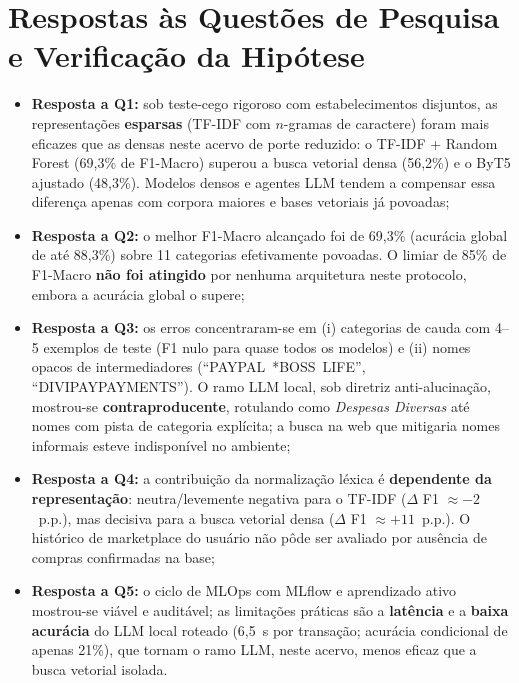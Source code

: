 \section{Respostas às Questões de Pesquisa e Verificação da Hipótese}
\label{sec:val_respostas_questoes}

\begin{itemize}
	\item \textbf{Resposta a Q1:} sob teste-cego rigoroso com estabelecimentos disjuntos,
	as representações \textbf{esparsas} (TF-IDF com $n$-gramas de caractere) foram mais
	eficazes que as densas neste acervo de porte reduzido: o TF-IDF + Random Forest
	(69,3\% de F1-Macro) superou a busca vetorial densa
	(56,2\%) e o ByT5 ajustado (48,3\%). Modelos
	densos e agentes LLM tendem a compensar essa diferença apenas com corpora maiores e bases
	vetoriais já povoadas;

	\item \textbf{Resposta a Q2:} o melhor F1-Macro alcançado foi de
	69,3\% (acurácia global de até 88,3\%) sobre 11
	categorias efetivamente povoadas. O limiar de 85\% de F1-Macro \textbf{não foi
	atingido} por nenhuma arquitetura neste protocolo, embora a acurácia global o supere;

	\item \textbf{Resposta a Q3:} os erros concentraram-se em (i) categorias de cauda com
	4--5 exemplos de teste (F1 nulo para quase todos os modelos) e (ii) nomes opacos de
	intermediadores (``PAYPAL~*BOSS~LIFE'', ``DIVIPAYPAYMENTS''). O ramo LLM local, sob
	diretriz anti-alucinação, mostrou-se \textbf{contraproducente}, rotulando como
	\textit{Despesas Diversas} até nomes com pista de categoria explícita; a busca na web
	que mitigaria nomes informais esteve indisponível no ambiente;

	\item \textbf{Resposta a Q4:} a contribuição da normalização léxica é \textbf{dependente
	da representação}: neutra/levemente negativa para o TF-IDF ($\Delta$ F1 $\approx -2$~p.p.),
	mas decisiva para a busca vetorial densa ($\Delta$ F1 $\approx +11$~p.p.). O histórico de
	marketplace do usuário não pôde ser avaliado por ausência de compras confirmadas na base;

	\item \textbf{Resposta a Q5:} o ciclo de MLOps com MLflow e aprendizado ativo mostrou-se
	viável e auditável; as limitações práticas são a \textbf{latência} e a \textbf{baixa
	acurácia} do LLM local roteado (6,5~s por
	transação; acurácia condicional de apenas 21\%), que tornam o ramo LLM,
	neste acervo, menos eficaz que a busca vetorial isolada.
\end{itemize}

